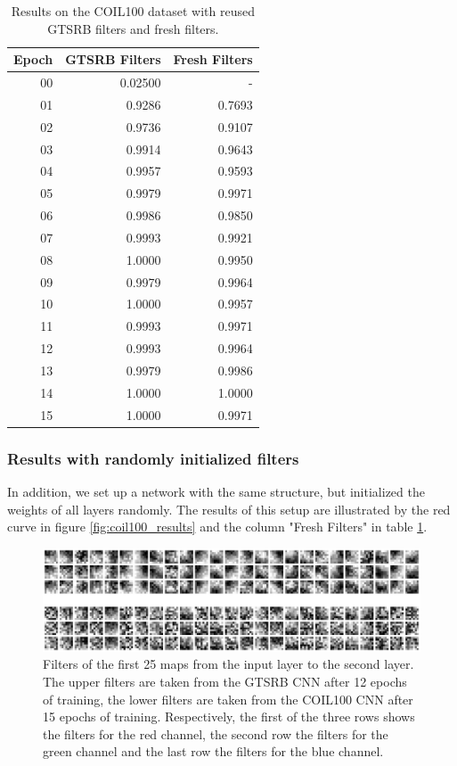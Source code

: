 \documentclass[11pt, a4paper]{article}
\begin{document}
\begin{table}[h!]
	\centering
	\begin{tabular}{|r|rr|}
		\hline
		Epoch & GTSRB Filters & Fresh Filters\\ \hline
		00 & 0.02500 & -\\
		01 & 0.9286 & 0.7693\\
		02 & 0.9736 & 0.9107\\
		03 & 0.9914 & 0.9643\\
		04 & 0.9957 & 0.9593\\
		05 & 0.9979 & 0.9971\\
		06 & 0.9986 & 0.9850\\
		07 & 0.9993 & 0.9921\\
		08 & 1.0000 & 0.9950\\
		09 & 0.9979 & 0.9964\\
		10 & 1.0000 & 0.9957\\
		11 & 0.9993 & 0.9971\\
		12 & 0.9993 & 0.9964\\
		13 & 0.9979 & 0.9986\\
		14 & 1.0000 & 1.0000\\
		15 & 1.0000 & 0.9971\\ \hline
	\end{tabular}

	\caption{Results on the COIL100 dataset with reused GTSRB filters and fresh filters.}
	\label{tab:coil-results}
\end{table}

\subsubsection{Results with randomly initialized filters}

In addition, we set up a network with the same structure, but initialized the weights of all layers randomly. The results of this setup are illustrated by the red curve in figure \ref{fig:coil100_results} and the column "Fresh Filters" in table \ref{tab:coil-results}.

\begin{figure}[h!]
	\centering
	\includegraphics[width=1\textwidth]{gtsrb_vs_coil_filters.png}
	\caption{Filters of the first 25 maps from the input layer to the second layer. The upper filters are taken from the GTSRB CNN after 12 epochs of training, the lower filters are taken from the COIL100 CNN after 15 epochs of training. Respectively, the first of the three rows shows the filters for the red channel, the second row the filters for the green channel and the last row the filters for the blue channel.}
	\label{fig:gtsrb_vs_coil_filters}
\end{figure}
\end{document}
